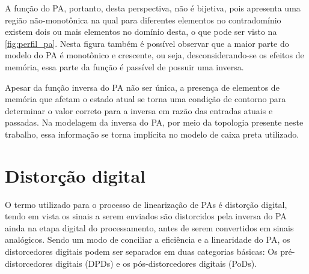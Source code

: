 A função do PA, portanto, desta perspectiva, não é bijetiva, pois apresenta uma região não-monotônica na qual para diferentes elementos no contradomínio existem dois ou mais elementos no domínio desta, o que pode ser visto na \autoref{fig:perfil_pa}. Nesta figura também é possível observar que a maior parte do modelo do PA é monotônico e crescente, ou seja, desconsiderando-se os efeitos de memória, essa parte da função é passível de possuir uma inversa.


Apesar da função inversa do PA não ser única, a presença de elementos de memória que afetam o estado atual se torna uma condição de contorno para determinar o valor correto para a inversa em razão das entradas atuais e passadas. Na modelagem da inversa do PA, por meio da topologia presente neste trabalho, essa informação se torna implícita no modelo de caixa preta utilizado.

\section{Distorção digital} \label{sec:fundteo-distor}
O termo utilizado para o processo de linearização de PAs é distorção digital, tendo em vista os sinais a serem enviados são distorcidos pela inversa do PA ainda na etapa digital do processamento, antes de serem convertidos em sinais analógicos. Sendo um modo de conciliar a eficiência e a linearidade do PA, os distorcedores digitais podem ser separados em duas categorias básicas: Os pré-distorcedores digitais (DPDs) e os pós-distorcedores digitais (PoDs).

